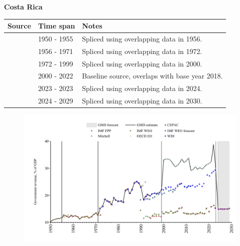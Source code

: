 \documentclass[12pt,a4paper,landscape]{article}
\begin{document}
\begin{adjustbox}{max totalsize={\paperwidth}{\paperheight},center}
\begin{minipage}[t][\textheight][t]{\textwidth}
\vspace*{0.5cm}
{}
\begin{center}
{\Large\bfseries Costa Rica}
\end{center}
\vspace{0.5cm}
\begin{table}[H]
\centering
\small
\begin{tabular}{|l|l|l|}
\hline
\textbf{Source} & \textbf{Time span} & \textbf{Notes} \\
\hline
\rowcolor{white}\cite{Mitchell}& 1950 - 1955 &Spliced using overlapping data in 1956.\\
\rowcolor{lightgray}\cite{IMF_FPP}& 1956 - 1971 &Spliced using overlapping data in 1972.\\
\rowcolor{white}\cite{WDI}& 1972 - 1999 &Spliced using overlapping data in 2000.\\
\rowcolor{lightgray}\cite{OECD_EO}& 2000 - 2022 &Baseline source, overlaps with base year 2018.\\
\rowcolor{white}\cite{WDI}& 2023 - 2023 &Spliced using overlapping data in 2024.\\
\rowcolor{lightgray}\cite{IMF_WEO_forecast}& 2024 - 2029 &Spliced using overlapping data in 2030.\\
\hline
\end{tabular}
\end{table}
\begin{figure}[H]
\centering
\includegraphics[width=\textwidth,height=0.6\textheight,keepaspectratio]{graphs/CRI_govrev_GDP.pdf}
\end{figure}
\end{minipage}
\end{adjustbox}
\end{document}
